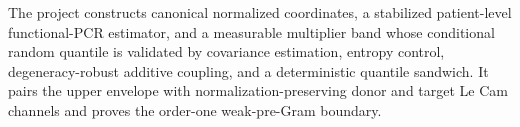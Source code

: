 The project constructs canonical normalized coordinates, a stabilized patient-level functional-PCR estimator, and a measurable multiplier band whose conditional random quantile is validated by covariance estimation, entropy control, degeneracy-robust additive coupling, and a deterministic quantile sandwich. It pairs the upper envelope with normalization-preserving donor and target Le Cam channels and proves the order-one weak-pre-Gram boundary.
